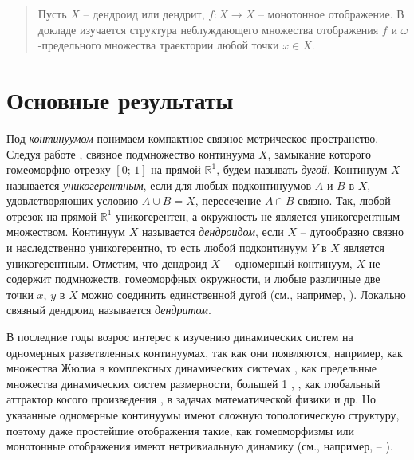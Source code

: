 \begin{abstract}
Пусть $X$ -- дендроид или дендрит, $f:X\to X$ -- монотонное отображение. В докладе изучается структура неблуждающего множества отображения $f$ и $\omega$-предельного множества  траектории любой точки $x\in X$.

\end{abstract}

\section{Основные результаты} %

Под {\it континуумом} понимаем компактное связное метрическое пространство. Следуя работе \cite{EM2021}, связное подмножество континуума $X$, замыкание которого гомеоморфно отрезку $[0;\,1]$ на прямой ${\mathbb R^1}$, будем называть {\it дугой}. Континуум  $X$ называется {\it уникогерентным}, если  для любых  подконтинуумов  $A$ и $B$ в $X$, удовлетворяющих условию $A\cup B=X$, пересечение $A\cap B$ связно. Так, любой отрезок на прямой $\mathbb R^1$ уникогерентен, а окружность не является уникогерентным множеством. Континуум $X$ называется {\it дендроидом}, если $X$ -- дугообразно связно и наследственно уникогерентно, то есть любой подконтинуум  $Y$ в $X$ является уникогерентным. Отметим, что дендроид $X$~-- одномерный континуум, $X$ не содержит подмножеств, гомеоморфных окружности, и любые различные две точки $x,\,y$ в $X$ можно соединить единственной дугой (см., например, \cite{Na}). Локально связный дендроид называется {\it дендритом}.

В последние годы возрос интерес  к изучению динамических систем на одномерных разветвленных континуумах, так как они появляются, например, как множества Жюлиа  в комплексных динамических системах \cite{PeRi}, как предельные множества динамических систем размерности, большей 1 \cite{AC91}, \cite{BG}, как глобальный аттрактор косого произведения   \cite{Efr23}, в задачах математической физики \cite{SakSm} и др. Но указанные одномерные континуумы имеют сложную топологическую структуру, поэтому даже простейшие отображения такие, как гомеоморфизмы или монотонные отображения имеют нетривиальную динамику (см., например, \cite{EM2001} -- \cite{Nag12}).

